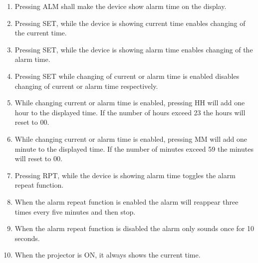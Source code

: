 \documentclass[Main_Assignment2]{subfiles}
\begin{document}
\begin{enumerate}[label=RE\arabic*:]
	\item
	Pressing ALM shall make the device show alarm time on the display.

	\item
	Pressing SET, while the device is showing current time enables changing of the current time.

	\item
	Pressing SET, while the device is showing alarm time enables changing of the alarm time.

	\item
	Pressing SET while changing of current or alarm time is enabled disables changing of current or alarm time respectively.

	\item
	While changing current or alarm time is enabled, pressing HH will add one hour to the displayed time. If the number of hours exceed 23 the hours will reset to 00.

	\item
	While changing current or alarm time is enabled, pressing MM will add one minute to the displayed time. If the number of minutes exceed 59 the minutes will reset to 00.

	\item 
	Pressing RPT, while the device is showing alarm time toggles the alarm repeat function.

	\item
	When the alarm repeat function is enabled the alarm will reappear three times every five minutes and then stop.

	\item
	When the alarm repeat function is disabled the alarm only sounds once for 10 seconds.

	\item
	When the projector is ON, it always shows the current time.

\end{enumerate}
\end{document}
